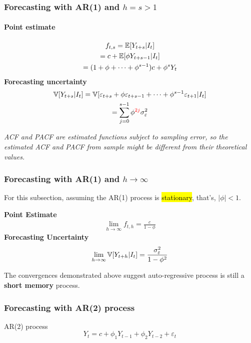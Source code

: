 \documentclass[11pt]{article}
\begin{document}
		\subsubsection{Forecasting with AR(1) and $h=s>1$}
			\paragraph{Point estimate}
				\begin{gather}
					f_{t,s} = \mathbb{E}[{Y_{t+s}|I_t}] \\
					= c + \mathbb{E}[{\phi Y_{t+s-1}|I_t}] \\
					= (1 + \phi + \dots + \phi^{s-1}) c + \phi^s Y_t
				\end{gather}
			\textbf{Forecasting uncertainty}
				\begin{gather}
					\mathbb{V}[{Y_{t+s}|I_t}] = \mathbb{V}[{\varepsilon_{t+s} + \phi \varepsilon_{t+s-1} + \dots + \phi^{s-1} \varepsilon_{t+1} | I_t}] \\
					= \sum_{j=0}^{s-1} \phi^{\textcolor{red}{2j}} \sigma_\varepsilon^2
				\end{gather}
			\begin{remark}
				\emph{ACF and PACF are estimated functions subject to sampling error, so the estimated ACF and PACF from sample might be different from their theoretical values.}
			\end{remark}
		\subsubsection{Forecasting with AR(1) and $h \to \infty$}
			\begin{assumption}
				For this subsection, assuming the AR(1) process is \hl{stationary}, that's, $|\phi| < 1$.
			\end{assumption}
			\textbf{Point Estimate}
				\begin{gather}
					\lim_{h \to \infty} f_{t, h} = \frac{c}{1 - \phi}
				\end{gather}
			\textbf{Forecasting Uncertainty}
				\begin{gather}
					\lim_{h \to \infty} \mathbb{V}[{Y_{t+h}|I_t}] = \frac{\sigma_\varepsilon^2}{1 - \phi^2}
				\end{gather}
			\begin{remark}
				The convergences demonstrated above suggest auto-regressive process is still a \textbf{short memory} process.
			\end{remark}
			
		\subsubsection{Forecasting with AR(2) process}
			\begin{definition}
				AR(2) process
				\begin{equation}
					Y_t = c + \phi_1 Y_{t-1} + \phi_2 Y_{t-2} + \varepsilon_t
				\end{equation}
			\end{definition}
\end{document}
